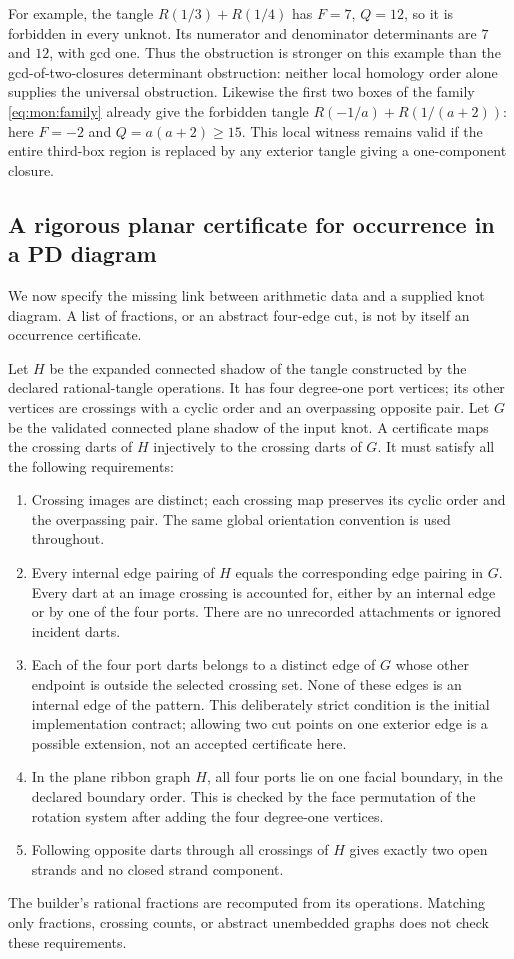 \documentclass[11pt,a4paper]{article}
\theoremstyle{definition}
\theoremstyle{remark}
\numberwithin{equation}{section}
\begin{document}
For example, the tangle $R(1/3)+R(1/4)$ has $F=7$, $Q=12$, so it is
forbidden in every unknot.  Its numerator and denominator determinants are
$7$ and $12$, with gcd one.  Thus the obstruction is stronger on this example
than the gcd-of-two-closures determinant obstruction: neither local homology
order alone supplies the universal obstruction.
Likewise the first two boxes of the family \eqref{eq:mon:family} already give
the forbidden tangle $R(-1/a)+R(1/(a+2))$: here $F=-2$ and
$Q=a(a+2)\ge15$.  This local witness remains valid if the entire third-box
region is replaced by any exterior tangle giving a one-component closure.

\subsection{A rigorous planar certificate for occurrence in a PD diagram}

We now specify the missing link between arithmetic data and a supplied knot
diagram.  A list of fractions, or an abstract four-edge cut, is not by itself
an occurrence certificate.

Let $H$ be the expanded connected shadow of the tangle constructed by the
declared rational-tangle operations.  It has four degree-one port vertices;
its other vertices are crossings with a cyclic order and an overpassing
opposite pair.  Let $G$ be the validated connected plane shadow of the input
knot.  A certificate maps the crossing darts of $H$ injectively to the crossing
darts of $G$.  It must satisfy all the following requirements:
\begin{enumerate}
\item Crossing images are distinct; each crossing map preserves its cyclic
      order and the overpassing pair.  The same global orientation convention
      is used throughout.
\item Every internal edge pairing of $H$ equals the corresponding edge pairing
      in $G$.  Every dart at an image crossing is accounted for, either by an
      internal edge or by one of the four ports.  There are no unrecorded
      attachments or ignored incident darts.
\item Each of the four port darts belongs to a distinct edge of $G$ whose
      other endpoint is outside the selected crossing set. None of these
      edges is an internal edge of the pattern. This deliberately strict
      condition is the initial implementation contract; allowing two cut
      points on one exterior edge is a possible extension, not an accepted
      certificate here.
\item In the plane ribbon graph $H$, all four ports lie on one facial boundary,
      in the declared boundary order.  This is checked by the face permutation
      of the rotation system after adding the four degree-one vertices.
\item Following opposite darts through all crossings of $H$ gives exactly two
      open strands and no closed strand component.
\end{enumerate}
The builder's rational fractions are recomputed from its operations.  Matching
only fractions, crossing counts, or abstract unembedded graphs does not check
these requirements.
\end{document}
